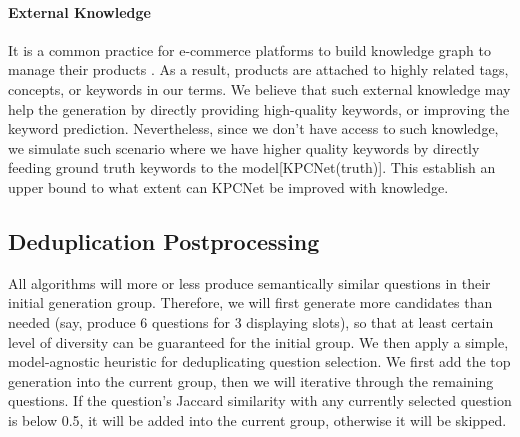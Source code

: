 \paragraph{External Knowledge} \label{sec:knowledge} It is a common practice for e-commerce platforms to build knowledge graph to manage their products \citep{dong2018challenges, luo2020alicoco}. As a result, products are attached to highly related tags, concepts, or keywords in our terms. We believe that such external knowledge may help the generation by directly providing high-quality keywords, or improving the keyword prediction. Nevertheless, since we don't have access to such knowledge, we simulate such scenario where we have higher quality keywords by directly feeding ground truth keywords to the model[KPCNet(truth)]. This establish an upper bound to what extent can KPCNet be improved with knowledge.

\subsection{Deduplication Postprocessing}
\label{sec:deduplicate}
All algorithms will more or less produce semantically similar questions in their initial generation group. Therefore, we will first generate more candidates than needed (say, produce 6 questions for 3 displaying slots), so that at least certain level of diversity can be guaranteed for the initial group. We then apply a simple, model-agnostic heuristic for deduplicating question selection. We first add the top generation into the current group, then we will iterative through the remaining questions. If the question's Jaccard similarity with any currently selected question is below 0.5, it will be added into the current group, otherwise it will be skipped. 

